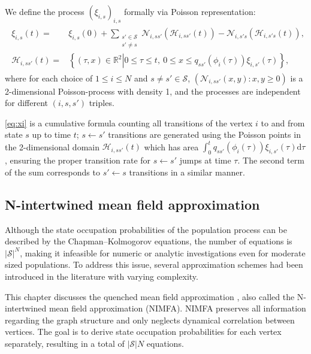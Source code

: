 \documentclass{article}
\renewcommand{\d}{\mathrm{d}}
\newcommand{\1}[1]{{\mathds{1}}_{\left\{#1\right\}}}
\newcommand{\N}{\mathcal{N}}
\newcommand{\HH}{\mathcal{H}}
\renewcommand{\S}{\mathcal{S}}
\begin{document}
	We define the process $\left(\xi_{i,s}\right)_{i,s}$ formally via Poisson representation:
	\begin{align}
		\label{eq:xi}
		\begin{split}
			{\xi}_{i,s}(t)=&\xi_{i,s}(0)+\sum_{\substack{s' \in \S \\ s' \neq s}} \N_{i,ss'} \left(\HH_{i,ss'}(t) \right)-\N_{i,s's} \left(\HH_{i,s's}(t) \right),\\
			\HH_{i,ss'}(t)=& \left\{(\tau,x) \in \mathbb{R}^2 \left. \right| 0 \leq \tau \leq t, \ 0 \leq x \leq q_{ss'} \left(\phi_{i}(\tau) \right)  {\xi}_{i,s'}(\tau)\right\},
		\end{split}
	\end{align}
	where for each choice of $1\leq i\leq N$ and $s\neq s'\in\S$, $\left(\N_{i,ss'}(x,y):x,y\geq 0\right)$ is a 2-dimensional Poisson-process with density 1, and the processes are independent for different $(i,s,s')$ triples.
	
	\eqref{eq:xi} is a cumulative formula counting all transitions of the vertex $i$ to and from state $s$ up to time $t$; $s \leftarrow s'$ transitions are generated using the Poisson points in the 2-dimensional domain $\HH_{i,ss'}(t)$ which has area $\int_0^t  q_{ss'} \left(\phi_{i}(\tau) \right)  {\xi}_{i,s'}(\tau) \d\tau$, ensuring the proper transition rate for $s \leftarrow s'$ jumps at time $\tau$. The second term of the sum corresponds to $s' \leftarrow s$ transitions in a similar manner.
	
	
	
	
	
	\subsection{N-intertwined mean field approximation}
	
	Although the state occupation probabilities of the population process can be described by the Chapman--Kolmogorov equations, the number of equations is $\left |\S \right|^N$, making it infeasible for numeric or analytic investigations even for moderate sized populations. To address this issue, several approximation schemes had been introduced in the literature with varying complexity.
	
	This chapter discusses the quenched mean field approximation \cite{NIMFA2011}, also called the N-intertwined mean field approximation (NIMFA). NIMFA preserves all information regarding the graph structure and only neglects dynamical correlation between vertices. The goal is to derive state occupation probabilities for each vertex separately, resulting in a total of $\left | \S \right | N$ equations. %
	
\end{document}
